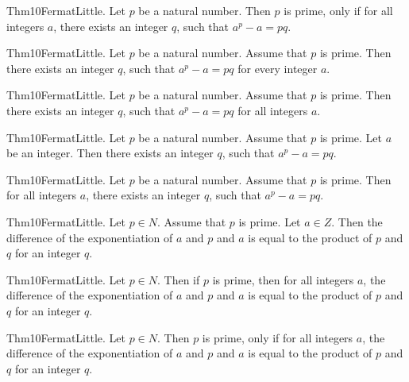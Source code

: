 \documentclass{article}
\begin{document}
Thm10FermatLittle. Let $p$ be a natural number. Then $p$ is prime, only if for all integers $a$, there exists an integer $q$, such that $a ^ {p}- a = p q$.

Thm10FermatLittle. Let $p$ be a natural number. Assume that $p$ is prime. Then there exists an integer $q$, such that $a ^ {p}- a = p q$ for every integer $a$.

Thm10FermatLittle. Let $p$ be a natural number. Assume that $p$ is prime. Then there exists an integer $q$, such that $a ^ {p}- a = p q$ for all integers $a$.

Thm10FermatLittle. Let $p$ be a natural number. Assume that $p$ is prime. Let $a$ be an integer. Then there exists an integer $q$, such that $a ^ {p}- a = p q$.

Thm10FermatLittle. Let $p$ be a natural number. Assume that $p$ is prime. Then for all integers $a$, there exists an integer $q$, such that $a ^ {p}- a = p q$.

Thm10FermatLittle. Let $p \in N$. Assume that $p$ is prime. Let $a \in Z$. Then the difference of the exponentiation of $a$ and $p$ and $a$ is equal to the product of $p$ and $q$ for an integer $q$.

Thm10FermatLittle. Let $p \in N$. Then if $p$ is prime, then for all integers $a$, the difference of the exponentiation of $a$ and $p$ and $a$ is equal to the product of $p$ and $q$ for an integer $q$.

Thm10FermatLittle. Let $p \in N$. Then $p$ is prime, only if for all integers $a$, the difference of the exponentiation of $a$ and $p$ and $a$ is equal to the product of $p$ and $q$ for an integer $q$.
\end{document}
